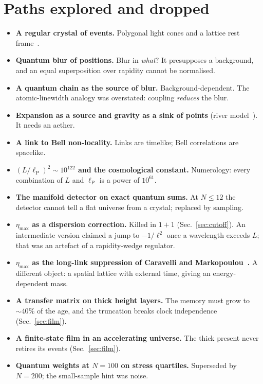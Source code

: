 \documentclass[11pt,a4paper]{article}
\newcommand{\lP}{\ell_{\mathrm P}}
\begin{document}
\appendix
\section{Paths explored and dropped}\label{app:dropped}
\begin{itemize}[leftmargin=*,itemsep=1pt]
\item \textbf{A regular crystal of events.} Polygonal light cones and a lattice rest frame~\cite{Burago,Weyl}.
\item \textbf{Quantum blur of positions.} Blur in \emph{what}? It presupposes a background, and an equal superposition over rapidity cannot be normalised.
\item \textbf{A quantum chain as the source of blur.} Background-dependent. The atomic-linewidth analogy was overstated: coupling \emph{reduces} the blur.
\item \textbf{Expansion as a source and gravity as a sink of points} (river model~\cite{HamiltonLisle08}). It needs an aether.
\item \textbf{A link to Bell non-locality.} Links are timelike; Bell correlations are spacelike.
\item \textbf{$(L/\lP)^2\sim10^{122}$ and the cosmological constant.} Numerology: every combination of $L$ and $\lP$ is a power of $10^{61}$.
\item \textbf{The manifold detector on exact quantum sums.} At $N\le12$ the detector cannot tell a flat universe from a crystal; replaced by sampling.
\item \textbf{$\eta_{\max}$ as a dispersion correction.} Killed in $1+1$ (Sec.~\ref{sec:cutoff}). An intermediate version claimed a jump to $-1/\ell^2$ once a wavelength exceeds $L$; that was an artefact of a rapidity-wedge regulator.
\item \textbf{$\eta_{\max}$ as the long-link suppression of Caravelli and Markopoulou~\cite{CM12}.} A different object: a spatial lattice with external time, giving an energy-dependent mass.
\item \textbf{A transfer matrix on thick height layers.} The memory must grow to $\sim40\%$ of the age, and the truncation breaks clock independence (Sec.~\ref{sec:film}).
\item \textbf{A finite-state film in an accelerating universe.} The thick present never retires its events (Sec.~\ref{sec:film}).
\item \textbf{Quantum weights at $N=100$ on stress quartiles.} Superseded by $N=200$; the small-sample hint was noise.
\end{itemize}
\end{document}
